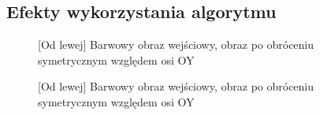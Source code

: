 \documentclass[a4paper,12pt, titlepage]{report}
\begin{document}
\subsection*{Efekty wykorzystania algorytmu}
\begin{figure}[h]
    \centering
    \caption{[Od lewej] Barwowy obraz wejściowy, obraz po obróceniu symetrycznym względem osi OY}%
    \label{fig:rysunek}%
\end{figure}
\FloatBarrier
\begin{figure}[h]
    \centering
    \caption{[Od lewej] Barwowy obraz wejściowy, obraz po obróceniu symetrycznym względem osi OY}%
    \label{fig:rysunek}%
\end{figure}
\FloatBarrier
\end{document}

